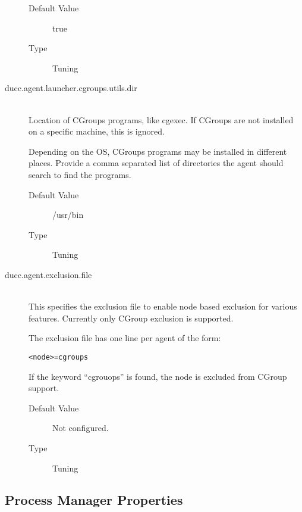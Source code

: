 \begin{description}
            \begin{description}
              \item[Default Value] true
              \item[Type] Tuning 
            \end{description}
            
          \item[ducc.agent.launcher.cgroups.utils.dir] \hfill \\
            \label{itm:ducc.agent.launcher.cgroups.utils.dir}
            Location of CGroups programs, like cgexec. If CGroups are not
            installed on a specific machine, this is ignored.

            Depending on the OS, CGroups programs may be installed in different places. 
            Provide a comma separated list of directories the agent should search to find the programs.  

            \begin{description}
              \item[Default Value] /usr/bin
              \item[Type] Tuning 
            \end{description}



	      \label{itm:props-agent.cgroups.exclusion}
          \item[ducc.agent.exclusion.file] \hfill \\
            This specifies the exclusion file to enable node based exclusion for various
            features.  Currently only CGroup exclusion is supported.

            The exclusion file has one line per agent of the form:
\begin{verbatim}
<node>=cgroups
\end{verbatim}
            If the keyword ``cgrouops'' is found, the node is excluded from CGroup
            support. 
          
            \begin{description}
              \item[Default Value] Not configured.
              \item[Type] Tuning 
            \end{description}
            

          \end{description}
      

\subsection{Process Manager Properties}

